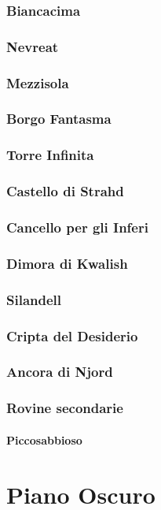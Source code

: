 \documentclass[10pt,twoside,onecolumn,openany]{book}
\begin{document}
\subsection{Biancacima}
\newpage
\subsection{Nevreat}
\newpage
\subsection{Mezzisola}
\newpage
\subsection{Borgo Fantasma}
\newpage
\subsection{Torre Infinita}
\newpage
\subsection{Castello di Strahd}
\newpage
\subsection{Cancello per gli Inferi}
\newpage
\subsection{Dimora di Kwalish}
\newpage
\subsection{Silandell}
\newpage
\subsection{Cripta del Desiderio}
\newpage
\subsection{Ancora di Njord}
\newpage
\subsection{Rovine secondarie}
\subsubsection{Piccosabbioso}
\newpage
\chapter{Piano Oscuro}
\end{document}
